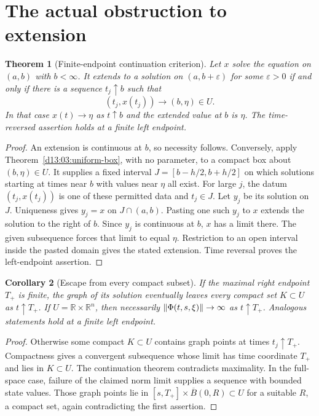 \documentclass[11pt,oneside]{book}
\newtheorem{theorem}{Theorem}[chapter]
\newtheorem{corollary}[theorem]{Corollary}
\theoremstyle{definition}
\theoremstyle{remark}\newtheorem{remark}[theorem]{Remark}
\newcommand{\R}{\mathbb R}\newcommand{\C}{\mathbb C}
\begin{document}
\section{The actual obstruction to extension}
\begin{theorem}[Finite-endpoint continuation criterion]\label{d13:04:continuation}
Let $x$ solve the equation on $(a,b)$ with $b<\infty$. It extends to a
solution on $(a,b+\varepsilon)$ for some $\varepsilon>0$ if and only if
there is a sequence $t_j\uparrow b$ such that
\[
 (t_j,x(t_j))\longrightarrow(b,\eta)\in U.
\]
In that case $x(t)\to\eta$ as $t\uparrow b$ and the extended value at
$b$ is $\eta$. The time-reversed assertion holds at a finite left endpoint.
\end{theorem}
\begin{proof}
An extension is continuous at $b$, so necessity follows. Conversely,
apply Theorem~\ref{d13:03:uniform-box}, with no parameter, to a compact
box about $(b,\eta)\in U$. It supplies a fixed interval
$J=[b-h/2,b+h/2]$ on which solutions starting at times near $b$ with
values near $\eta$ all exist. For large $j$, the datum
$(t_j,x(t_j))$ is one of these permitted data and $t_j\in J$.
Let $y_j$ be its solution on $J$. Uniqueness gives $y_j=x$ on
$J\cap(a,b)$. Pasting one such $y_j$ to $x$ extends the solution to
the right of $b$. Since $y_j$ is continuous at $b$, $x$ has a limit
there. The given subsequence forces that limit to equal $\eta$.
Restriction to an open interval inside the pasted domain gives the
stated extension. Time reversal proves the left-endpoint assertion.
\end{proof}

\begin{corollary}[Escape from every compact subset]\label{d13:04:escape}
If the maximal right endpoint $T_+$ is finite, the graph of its solution
eventually leaves every compact set $K\subset U$ as $t\uparrow T_+$.
If $U=\R\times\R^n$, then necessarily
$\lVert\Phi(t,s,\xi)\rVert\to\infty$ as $t\uparrow T_+$. Analogous
statements hold at a finite left endpoint.
\end{corollary}
\begin{proof}
Otherwise some compact $K\subset U$ contains graph points at times
$t_j\uparrow T_+$. Compactness gives a convergent subsequence whose
limit has time coordinate $T_+$ and lies in $K\subset U$.
The continuation theorem contradicts maximality. In the full-space
case, failure of the claimed norm limit supplies a sequence with bounded
state values. Those graph points lie in
$[s,T_+]\times\overline B(0,R)\subset U$ for a suitable $R$, a compact
set, again contradicting the first assertion.
\end{proof}
\end{document}
